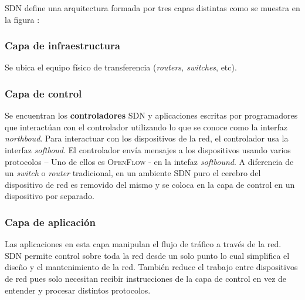 \documentclass[10pt,journal,compsoc]{IEEEtran}
\begin{document}
SDN define una arquitectura formada por tres capas distintas como se muestra en la figura \pageref{fig:sdn-arquitectura}:
\subsubsection*{Capa de infraestructura}
Se ubica el equipo físico de transferencia (\emph{routers, switches}, etc).

\subsubsection*{Capa de control}
Se encuentran los \textbf{controladores} SDN y aplicaciones escritas por programadores que interactúan con el controlador utilizando lo que se conoce como la interfaz \emph{northboud}. Para interactuar con los dispositivos de la red, el controlador usa la interfaz \emph{softboud}. El controlador envía mensajes a los dispositivos usando varios protocolos -- Uno de ellos es \textsc{OpenFlow} - en la intefaz \emph{softbound}. A diferencia de un \emph{switch} o \emph{router} tradicional, en un ambiente SDN puro el cerebro del dispositivo de red es removido del mismo y se coloca en la capa de control en un dispositivo por separado.

%

\subsubsection*{Capa de aplicación}
Las aplicaciones en esta capa manipulan el flujo de tráfico a través de la red. SDN permite control sobre toda la red desde un solo punto lo cual simplifica el diseño y el mantenimiento de la red. También reduce el trabajo entre dispositivos de red pues solo necesitan recibir instrucciones de la capa de control en vez de entender y procesar distintos protocolos.
\end{document}
